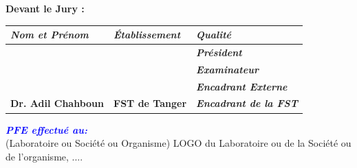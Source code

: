 \begin{titlepage}
\textbf{Devant le Jury :\hfill\phantom{}}\\[.5cm]
\setlength\extrarowheight{5pt} %
    \begin{tabularx}{\textwidth}{|X|X|X|}
    \hline
       \textbf{\textit{Nom et Prénom}} & \textbf{\textit{Établissement}} & \textbf{\textit{Qualité}} \\
       \hline
        & & \textbf{\textit{Président}} \\
        \hline
        & & \textbf{\textit{Examinateur}} \\
        \hline
        & & \textbf{\textit{Encadrant Externe}} \\
        \hline
        \textbf{Dr. Adil Chahboun} & \textbf{FST de Tanger} & \textbf{\textit{Encadrant de la FST}} \\
        \hline
    \end{tabularx}

\vfill
\textit{\textbf{\textcolor{blue}{PFE effectué au:}}}\\
(Laboratoire ou Société ou Organisme)
\vfill
LOGO du Laboratoire ou de la Société ou de l’organisme, ....

\end{titlepage}
